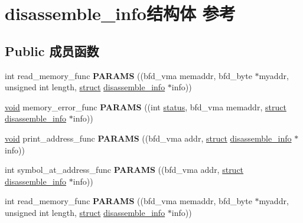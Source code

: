 \hypertarget{structdisassemble__info}{}\section{disassemble\+\_\+info结构体 参考}
\label{structdisassemble__info}
\subsection*{Public 成员函数}
\begin{DoxyCompactItemize}
\item 
\mbox{\label{structdisassemble__info_a19fa9cbf8bd02ca394bf5ac5fc07aefe}} 
int read\+\_\+memory\+\_\+func {\bfseries P\+A\+R\+A\+MS} ((bfd\+\_\+vma memaddr, bfd\+\_\+byte $\ast$myaddr, unsigned int length, \hyperlink{interfacestruct}{struct} \hyperlink{structdisassemble__info}{disassemble\+\_\+info} $\ast$info))
\item 
\mbox{\label{structdisassemble__info_a26bdd43c9af4d130eb60ac39fb1ed9db}} 
\hyperlink{interfacevoid}{void} memory\+\_\+error\+\_\+func {\bfseries P\+A\+R\+A\+MS} ((int \hyperlink{structstatus}{status}, bfd\+\_\+vma memaddr, \hyperlink{interfacestruct}{struct} \hyperlink{structdisassemble__info}{disassemble\+\_\+info} $\ast$info))
\item 
\mbox{\label{structdisassemble__info_a4e5401192e35362d428b4166b3d97e0e}} 
\hyperlink{interfacevoid}{void} print\+\_\+address\+\_\+func {\bfseries P\+A\+R\+A\+MS} ((bfd\+\_\+vma addr, \hyperlink{interfacestruct}{struct} \hyperlink{structdisassemble__info}{disassemble\+\_\+info} $\ast$info))
\item 
\mbox{\label{structdisassemble__info_ae0b0a089e489361f848cdeda2e1863e2}} 
int symbol\+\_\+at\+\_\+address\+\_\+func {\bfseries P\+A\+R\+A\+MS} ((bfd\+\_\+vma addr, \hyperlink{interfacestruct}{struct} \hyperlink{structdisassemble__info}{disassemble\+\_\+info} $\ast$info))
\item 
\mbox{\label{structdisassemble__info_a19fa9cbf8bd02ca394bf5ac5fc07aefe}} 
int read\+\_\+memory\+\_\+func {\bfseries P\+A\+R\+A\+MS} ((bfd\+\_\+vma memaddr, bfd\+\_\+byte $\ast$myaddr, unsigned int length, \hyperlink{interfacestruct}{struct} \hyperlink{structdisassemble__info}{disassemble\+\_\+info} $\ast$info))

\end{DoxyCompactItemize}
